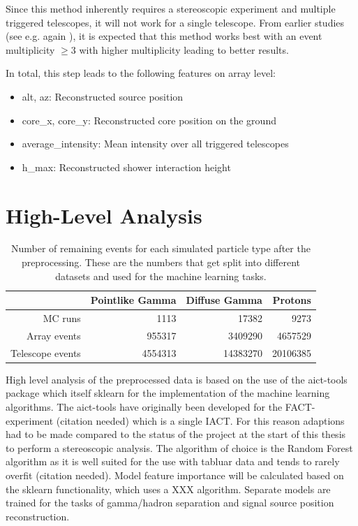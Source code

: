 Since this method inherently requires a stereoscopic experiment
and multiple triggered telescopes, it will not work for a single telescope.
From earlier studies (see e.g. again \cite{kai_diss}), it is expected
that this method works best with an event multiplicity 
$\geq 3$ with higher multiplicity leading to better results.

In total, this step leads to the following features on array level:
\begin{itemize}
    \item{alt, az: Reconstructed source position}
    \item{core\_x, core\_y: Reconstructed core position on the ground}
    \item{average\_intensity: Mean intensity over all triggered telescopes}
    \item{h\_max: Reconstructed shower interaction height}
\end{itemize}

\section{High-Level Analysis}

\begin{table}
    \begin{center}
        \begin{tabular}{| r | r | r | r |}
            \hline
            & Pointlike Gamma & Diffuse Gamma & Protons \\
            \hline
            MC runs & \num{1113} & \num{17382} &  \num{9273} \\ 
            \hline
            Array events & \num{955317} & \num{3409290} & \num{4657529} \\
            \hline
            Telescope events & \num{4554313} & \num{14383270} & \num{20106385} \\
            \hline
        \end{tabular}
    \end{center}
    \caption{Number of remaining events for each simulated particle type after the
    preprocessing. These are the numbers that get split into different datasets 
    and used for the machine learning tasks.}
    \label{tab:events_after_prep}
\end{table}

High level analysis of the preprocessed data is based on the use of
the aict-tools \cite{aict-tools} package which itself 
sklearn \cite{sklearn_api} for the implementation of the machine learning algorithms.
The aict-tools have originally been developed for the FACT-experiment
(citation needed) which is a single IACT. For this reason
adaptions had to be made compared to the status of the project at the start 
of this thesis to perform a stereoscopic analysis.
The algorithm of choice is the Random Forest algorithm
as it is well suited for the use with tabluar data and tends to rarely overfit
(citation needed).
Model feature importance will be calculated
based on the sklearn functionality, which
uses a XXX algorithm.
Separate models are trained for the tasks of gamma/hadron
separation and signal source position
reconstruction.

